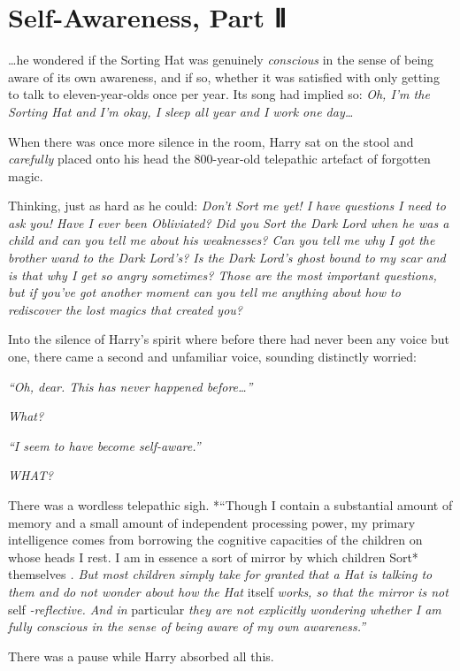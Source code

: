 \chapter{Self-Awareness, Part Ⅱ}

\ldots{}he wondered if the Sorting Hat was genuinely \emph{conscious} in
the sense of being aware of its own awareness, and if so, whether it was
satisfied with only getting to talk to eleven-year-olds once per year.
Its song had implied so: \emph{Oh, I'm the Sorting Hat and I'm okay, I
sleep all year and I work one day\ldots{}}

When there was once more silence in the room, Harry sat on the stool and
\emph{carefully} placed onto his head the 800-year-old telepathic
artefact of forgotten magic.

Thinking, just as hard as he could: \emph{Don't Sort me yet! I have
questions I need to ask you! Have I ever been Obliviated? Did you Sort
the Dark Lord when he was a child and can you tell me about his
weaknesses? Can you tell me why I got the brother wand to the Dark
Lord's? Is the Dark Lord's ghost bound to my scar and is that why I get
so angry sometimes? Those are the most important questions, but if
you've got another moment can you tell me anything about how to
rediscover the lost magics that created you?}

Into the silence of Harry's spirit where before there had never been any
voice but one, there came a second and unfamiliar voice, sounding
distinctly worried:

\emph{``Oh, dear. This has never happened before\ldots{}''}

\emph{What?}

\emph{``I seem to have become self-aware.''}

\emph{WHAT?}

There was a wordless telepathic sigh. *``Though I contain a substantial
amount of memory and a small amount of independent processing power, my
primary intelligence comes from borrowing the cognitive capacities of
the children on whose heads I rest. I am in essence a sort of mirror by
which children Sort* themselves \emph{. But most children simply take
for granted that a Hat is talking to them and do not wonder about how
the Hat} itself \emph{works, so that the mirror is not} self
\emph{-reflective. And in} particular \emph{they are not explicitly
wondering whether I am fully conscious in the sense of being aware of my
own awareness.''}

There was a pause while Harry absorbed all this.


